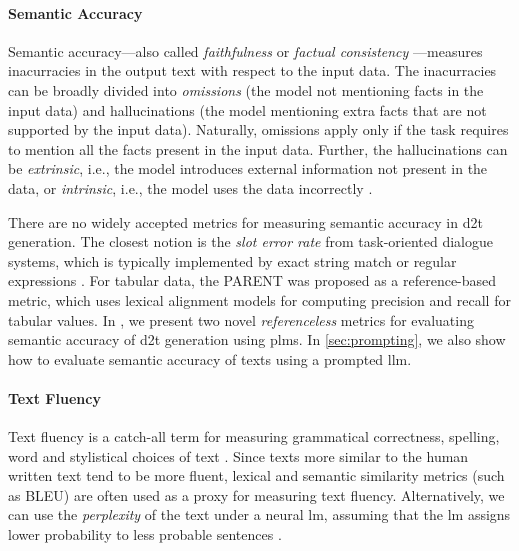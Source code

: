{\paragraph{Semantic Accuracy} Semantic accuracy---also called \emph{faithfulness} or \emph{factual consistency} \cite{celikyilmazEvaluationTextGeneration2021}---measures inacurracies in the output text with respect to the input data. The inacurracies can be broadly divided into \emph{omissions} (the model not mentioning facts in the input data) and hallucinations (the model mentioning extra facts that are not supported by the input data). Naturally, omissions apply only if the task requires to mention all the facts present in the input data. Further, the hallucinations can be \emph{extrinsic}, i.e., the model introduces external information not present in the data, or \emph{intrinsic}, i.e., the model uses the data incorrectly \cite{maynezFaithfulnessFactualityAbstractive2020}.

There are no widely accepted metrics for measuring semantic accuracy in \ac{d2t} generation. The closest notion is the \emph{slot error rate} from task-oriented dialogue systems, which is typically implemented by exact string match or regular expressions  \cite{wen2015semantically,dusekEvaluatingStateoftheartEndtoEnd2020}. For tabular data, the PARENT \cite{dhingraHandlingDivergentReference2019} was proposed as a reference-based metric, which uses lexical alignment models for computing precision and recall for tabular values.  In , we present two novel \emph{referenceless} metrics for evaluating semantic accuracy of \ac{d2t} generation using \acp{plm}. In \autoref{sec:prompting}, we also show how to evaluate semantic accuracy of texts using a prompted \ac{llm}.

\paragraph{Text Fluency} Text fluency is a catch-all term for measuring grammatical correctness, spelling, word and stylistical choices of text \cite{celikyilmazEvaluationTextGeneration2021}. Since texts more similar to the human written text tend to be more fluent, lexical and semantic similarity metrics (such as BLEU) are often used as a proxy for measuring text fluency. Alternatively, we can use the \emph{perplexity} of the text under a neural \ac{lm}, assuming that the \ac{lm} assigns lower probability to less probable sentences \cite{leeFactualityEnhancedLanguage2022,kaneNUBIANeUralBased2020}.


}
